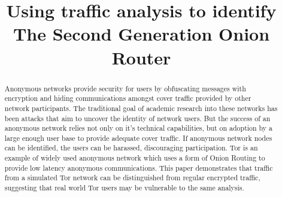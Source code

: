 \documentclass[conference]{IEEEtran}
\begin{document}
\title{Using traffic analysis to identify The Second Generation Onion Router}

\author{
  \and
  \and
}

\maketitle

\begin{abstract}
Anonymous networks provide security for users by obfuscating messages with
encryption and hiding communications amongst cover traffic provided by other
network participants. The traditional goal of academic research into these
networks has been attacks that aim to uncover the identity of network users.
But the success of an anonymous network relies not only on it's technical
capabilities, but on adoption by a large enough user base to provide adequate
cover traffic. If anonymous network nodes can be identified, the users
can be harassed, discouraging participation. Tor is an example of widely used
anonymous network which uses a form of Onion Routing to provide low latency
anonymous communications. This paper demonstrates that traffic from a simulated
Tor network can be distinguished from regular encrypted traffic, suggesting that
real world Tor users may be vulnerable to the same analysis.
\end{abstract}
\end{document}
